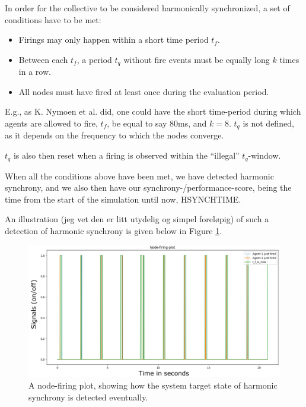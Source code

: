 In order for the collective to be considered harmonically synchronized, a set of conditions have to be met:

\begin{itemize}
	\item Firings may only happen within a short time period $t_f$.
	\item Between each $t_f$, a period $t_q$ without fire events must be equally long $k$ times in a row.
	\item All nodes must have fired at least once during the evaluation period.
\end{itemize}

E.g., as K. Nymoen et al. did, one could have the short time-period during which agents are allowed to fire, $t_f$, be equal to say 80ms, and $k=8$. $t_q$ is not defined, as it depends on the frequency to which the nodes converge.

$t_q$ is also then reset when a firing is observed within the ``illegal'' $t_q$-window.

When all the conditions above have been met, we have detected harmonic synchrony, and we also then have our synchrony-/performance-score, being the time from the start of the simulation until now, HSYNCHTIME.

An illustration (jeg vet den er litt utydelig og simpel foreløpig) of such a detection of harmonic synchrony is given below in Figure \ref{fig:node_firing_plot}.

\begin{figure}[h]
	\centering
	\includegraphics[width=0.9\linewidth]{Assets/Figures/node_firing_plot.pdf}
	\caption{A node-firing plot, showing how the system target state of harmonic synchrony is detected eventually.}
	\label{fig:node_firing_plot}
\end{figure}